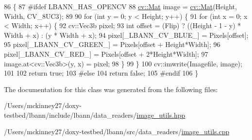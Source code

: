 \begin{DoxyCode}
86                                                                                                            
             \{
87 \textcolor{preprocessor}{#ifdef LBANN\_HAS\_OPENCV}
88   \hyperlink{base_8hpp_a68f11fdc31b62516cb310831bbe54d73}{cv::Mat} image = \hyperlink{base_8hpp_a68f11fdc31b62516cb310831bbe54d73}{cv::Mat}(Height, Width, CV\_8UC3);
89 
90   \textcolor{keywordflow}{for} (\textcolor{keywordtype}{int} y = 0; y < Height; y++) \{
91     \textcolor{keywordflow}{for} (\textcolor{keywordtype}{int} x = 0; x < Width; x++) \{
92       cv::Vec3b pixel;
93       \textcolor{keywordtype}{int} offset = (Flip) ? ((Height - 1 - y) * Width + x) : (y * Width + x);
94       pixel[\_LBANN\_CV\_BLUE\_]  = Pixels[offset];
95       pixel[\_LBANN\_CV\_GREEN\_] = Pixels[offset + Height*Width];
96       pixel[\_LBANN\_CV\_RED\_]   = Pixels[offset + 2*Height*Width];
97       image.at<cv::Vec3b>(y, x) = pixel;
98     \}
99   \}
100   cv::imwrite(Imagefile, image);
101 
102   \textcolor{keywordflow}{return} \textcolor{keyword}{true};
103 \textcolor{preprocessor}{#else}
104   \textcolor{keywordflow}{return} \textcolor{keyword}{false};
105 \textcolor{preprocessor}{#endif}
106 \}
\end{DoxyCode}


The documentation for this class was generated from the following files\+:\begin{DoxyCompactItemize}
\item 
/\+Users/mckinney27/doxy-\/testbed/lbann/include/lbann/data\+\_\+readers/\hyperlink{image__utils_8hpp}{image\+\_\+utils.\+hpp}\item 
/\+Users/mckinney27/doxy-\/testbed/lbann/src/data\+\_\+readers/\hyperlink{image__utils_8cpp}{image\+\_\+utils.\+cpp}\end{DoxyCompactItemize}
